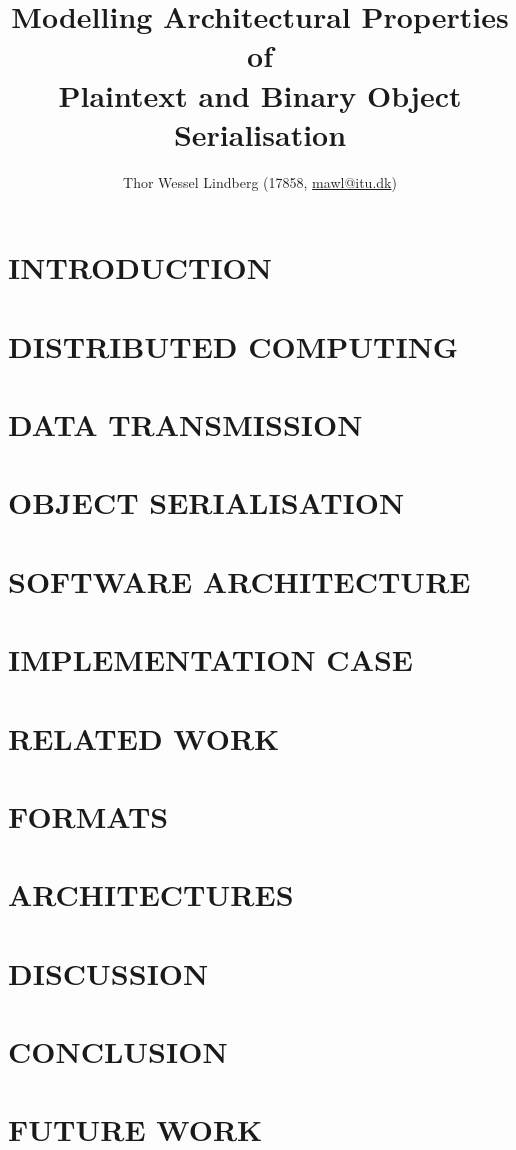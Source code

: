 \documentclass[10pt, twocolumn, letterpaper]{article}
\title{
    \vspace{-0.5cm}
    \huge \textbf{Modelling Architectural Properties of}  \\
    \huge \textbf{Plaintext and Binary Object Serialisation}  \\
}
\author{Thor Wessel Lindberg (17858, \href{mailto:mawl@itu.dk}{mawl@itu.dk})}
\date{}
\begin{document}
\maketitle



\section{INTRODUCTION}


\section{DISTRIBUTED COMPUTING} %


\section{DATA TRANSMISSION} %


\section{OBJECT SERIALISATION} %


\section{SOFTWARE ARCHITECTURE} %


\section{IMPLEMENTATION CASE} %


\section{RELATED WORK} %


\section{FORMATS} %


\section{ARCHITECTURES}

\section{DISCUSSION}


\section{CONCLUSION}


\section{FUTURE WORK}



\end{document}
